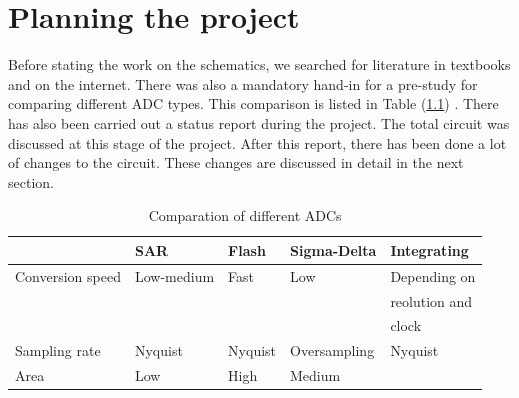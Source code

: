 \documentclass[english, 12pt, a4paper]{ifimaster}
\begin{document}
\chapter{Planning the project} 
Before stating the work on the schematics, we searched for literature in textbooks and on the internet. There was also a mandatory hand-in for a pre-study for comparing different ADC types. This 
comparison is listed in Table (\ref{comp:adc}) \cite{forstudie}. There has also been carried out a status report during the project. The total circuit was discussed at this stage of the project.
After this report, there has been done a lot of changes to the circuit. These changes are discussed in detail in the next section. 

\begin{table}[!ht]
 \centering
 \begin{tabular}{|l|l|l|l|l|}
  \hline
                   & SAR        & Flash   & Sigma-Delta  & Integrating          \\ \hline
  Conversion speed & Low-medium & Fast    & Low          & Depending on 	\\
		   &	        &	  &		 & reolution and 	\\
		   &		&	  &		 & clock 		\\ \hline
  Sampling rate    & Nyquist    & Nyquist & Oversampling & Nyquist              \\ \hline
  Area             & Low        & High    & Medium       &                      \\ \hline
 \end{tabular}
 \caption{Comparation of different ADCs}
 \label{comp:adc}
\end{table}



\end{document}
